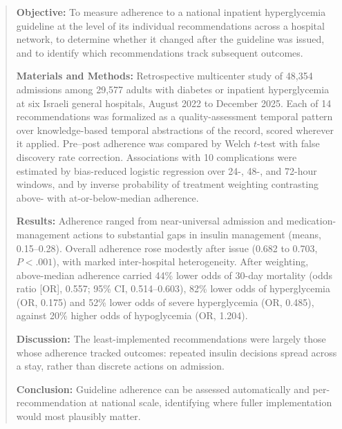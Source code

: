 \begin{abstract}
\noindent
\textbf{Objective:}
To measure adherence to a national inpatient hyperglycemia guideline at the
level of its individual recommendations across a hospital network, to
determine whether it changed after the guideline was issued, and to identify
which recommendations track subsequent outcomes.

\noindent
\textbf{Materials and Methods:}
Retrospective multicenter study of 48,354 admissions among 29,577 adults
with diabetes or inpatient hyperglycemia at six Israeli general hospitals,
August 2022 to December 2025. Each of 14 recommendations was formalized as a
quality-assessment temporal pattern over knowledge-based temporal
abstractions of the record, scored wherever it applied. Pre--post adherence was compared by
Welch $t$-test with false discovery rate correction. Associations with 10
complications were estimated by bias-reduced logistic regression over 24-,
48-, and 72-hour windows, and by inverse probability of
treatment weighting contrasting above- with at-or-below-median adherence.

\noindent
\textbf{Results:}
Adherence ranged from near-universal admission and medication-management
actions to substantial gaps in insulin management (means, 0.15--0.28). Overall adherence rose modestly after issue (0.682 to 0.703,
$P<.001$), with marked inter-hospital heterogeneity. After weighting,
above-median adherence carried 44\% lower odds of 30-day mortality (odds
ratio [OR], 0.557; 95\% CI, 0.514--0.603), 82\% lower odds of hyperglycemia
(OR, 0.175) and 52\% lower odds of severe hyperglycemia (OR, 0.485), against
20\% higher odds of hypoglycemia (OR, 1.204).

\noindent
\textbf{Discussion:}
The least-implemented recommendations were largely those whose adherence
tracked outcomes: repeated insulin decisions spread across a stay, rather
than discrete actions on admission.

\noindent
\textbf{Conclusion:}
Guideline adherence can be assessed automatically and per-recommendation at
national scale, identifying where fuller implementation would most plausibly
matter.
\end{abstract}

